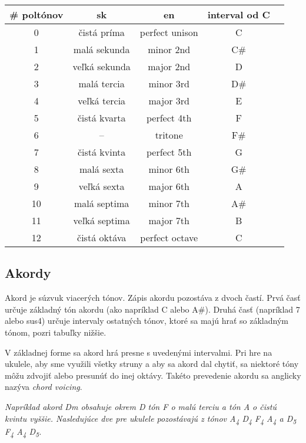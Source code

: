 \begin{center}
\begin{tabular}{ c c c c c }
    \# poltónov & sk & en & interval od C \\
    \hline
    0 & čistá príma & perfect unison & C \\
    1 & malá sekunda & minor 2nd & C\# \\
    2 & veľká sekunda & major 2nd & D \\
    3 & malá tercia & minor 3rd & D\# \\
    4 & veľká tercia & major 3rd & E \\
    5 & čistá kvarta & perfect 4th & F \\
    6 & -- & tritone & F\# \\
    7 & čistá kvinta & perfect 5th & G \\
    8 & malá sexta & minor 6th & G\# \\
    9 & veľká sexta & major 6th & A \\
    10 & malá septima & minor 7th & A\# \\
    11 & veľká septima & major 7th & B \\
    12 & čistá oktáva & perfect octave & C \\
\end{tabular}
\end{center}


\subsection*{Akordy}

Akord je súzvuk viacerých tónov. Zápis akordu pozostáva z dvoch častí. Prvá časť
určuje základný tón akordu (ako napríklad C alebo A\#). Druhá časť (napríklad 7 alebo sus4)
určuje intervaly ostatných tónov, ktoré sa majú hrať so základným tónom, pozri tabuľky nižšie.

V základnej forme sa akord hrá presne s uvedenými intervalmi. Pri hre na ukulele, aby sme využili
všetky struny a aby sa akord dal chytiť, sa niektoré tóny môžu zdvojiť alebo presunúť do inej
oktávy. Takéto prevedenie akordu sa anglicky nazýva \textit{chord voicing}.

\textit{%
Napríklad akord Dm obsahuje okrem D tón F o malú terciu a tón A o čistú kvintu vyššie. Nasledujúce
dve  pre ukulele pozostávajú z tónov A\textsubscript{4} D\textsubscript{4} F\textsubscript{4} A\textsubscript{4}
a D\textsubscript{5} F\textsubscript{4} A\textsubscript{4} D\textsubscript{5}.
}


